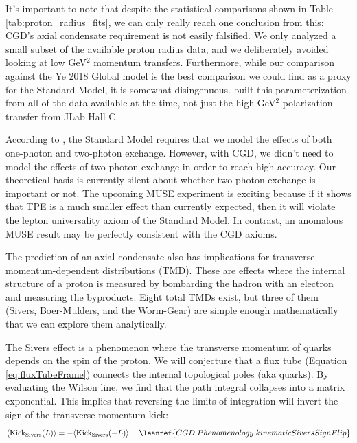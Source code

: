 It's important to note that despite the statistical comparisons shown in Table \ref{tab:proton_radius_fits}, we can only really reach one conclusion from this: CGD's axial condensate requirement is not easily falsified. We only analyzed a small subset of the available proton radius data, and we deliberately avoided looking at low GeV$^2$ momentum transfers. Furthermore, while our comparison against the Ye 2018 Global model is the best comparison we could find as a proxy for the Standard Model, it is somewhat disingenuous. \citet{ye2018proton} built this parameterization from all of the data available at the time, not just the high GeV$^2$ polarization transfer from JLab Hall C.

According to \citet{miller2026proton}, the Standard Model requires that we model the effects of both one-photon and two-photon exchange. However, with CGD, we didn't need to model the effects of two-photon exchange in order to reach high accuracy. Our theoretical basis is currently silent about whether two-photon exchange is important or not. The upcoming MUSE experiment \citet{cline2021muse} is exciting because if it shows that TPE is a much smaller effect than currently expected, then it will violate the lepton universality axiom of the Standard Model. In contrast, an anomalous MUSE result may be perfectly consistent with the CGD axioms.

The prediction of an axial condensate also has implications for transverse momentum-dependent distributions (TMD). These are effects where the internal structure of a proton is measured by bombarding the hadron with an electron and measuring the byproducts. Eight total TMDs exist, but three of them (Sivers, Boer-Mulders, and the Worm-Gear) are simple enough mathematically that we can explore them analytically.

The Sivers effect is a phenomenon where the transverse momentum of quarks depends on the spin of the proton. We will conjecture that a flux tube (Equation \ref{eq:fluxTubeFrame}) connects the internal topological poles (aka quarks). By evaluating the Wilson line, we find that the path integral collapses into a matrix exponential. This implies that reversing the limits of integration will invert the sign of the transverse momentum kick:
\begin{equation}
    \langle \text{Kick}_{\text{Sivers}}(L) \rangle = - \langle \text{Kick}_{\text{Sivers}}(-L) \rangle .
    \quad \leanref{CGD.Phenomenology.kinematicSiversSignFlip}
    \label{eq:kinematicSiversSignFlip}
\end{equation}

